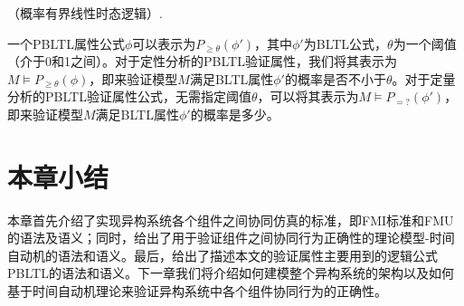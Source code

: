 \begin{define}\label{def:pbltl}
（概率有界线性时态逻辑）.

一个PBLTL属性公式$\phi$可以表示为$P_{\geq \theta}(\phi')$，其中$\phi'$为BLTL公式，$\theta$为一个阈值（介于0和1之间）。对于定性分析的PBLTL验证属性，我们将其表示为$M \models P_{\geq \theta}(\phi)$，即来验证模型$M$满足BLTL属性$\phi'$的概率是否不小于$\theta$。对于定量分析的PBLTL验证属性公式，无需指定阈值$\theta$，可以将其表示为$M \models P_{=?}(\phi')$，即来验证模型$M$满足BLTL属性$\phi'$的概率是多少。
\end{define}


\section{本章小结}
本章首先介绍了实现异构系统各个组件之间协同仿真的标准，即FMI标准和FMU的语法及语义；同时，给出了用于验证组件之间协同行为正确性的理论模型-时间自动机的语法和语义。最后，给出了描述本文的验证属性主要用到的逻辑公式PBLTL的语法和语义。下一章我们将介绍如何建模整个异构系统的架构以及如何基于时间自动机理论来验证异构系统中各个组件协同行为的正确性。

